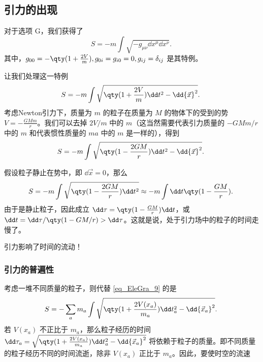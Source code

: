 \subsection{引力的出现}
对于选项 G，我们获得了
\begin{equation}
S=-m\int\sqrt{-g_{\mu\nu}\dd x^\mu\dd x^\nu}.~
\end{equation}
其中，$g_{00}=-\qty(1+\frac{2V}{m}),g_{0i}=g_{i0}=0,g_{ij}=\delta_{ij}$ 是其特例。

让我们处理这一特例
\begin{equation}\label{eq_EleGra_9}
S=-m\int\sqrt{\qty(1+\frac{2V}{m})\dd t^2-\dd {\vec x}^2}.~
\end{equation}
考虑Newton引力下，质量为 $m$ 的粒子在质量为 $M$ 的物体下的受到的势 $V=-\frac{GMm}{r}$。我们可以去掉 $2V/m$ 中的 $m$（这当然需要代表引力质量的 $-GMm/r$ 中的 $m$ 和代表惯性质量的 $ma$ 中的 $m$ 是一样的），得到
\begin{equation}
S=-m\int\sqrt{\qty(1-\frac{2GM}{r})\dd t^2-\dd {\vec x}^2}.~
\end{equation}

假设粒子静止在势中，即 $\dd {\vec x}=0$，那么
\begin{equation}
S=-m\int\sqrt{\qty(1-\frac{2GM}{r})\dd t^2}\approx-m\int\dd t\qty(1-\frac{GM}{r}).~
\end{equation}
由于是静止粒子，因此成立 $\dd\tau=\qty(1-\frac{GM}{r})\dd t$，或 $\dd t=\dd \tau/\qty(1-GM/r)>\dd\tau$。这就是说，处于引力场中的粒子的时间走慢了。

引力影响了时间的流动！

\subsubsection{引力的普遍性}
考虑一堆不同质量的粒子，则代替 \autoref{eq_EleGra_9} 的是
\begin{equation}
S=-\sum_a m_a\int\sqrt{\qty(1+\frac{2V(x_a)}{m_a})\dd t_a^2-\dd {\vec x_a}^2}.~
\end{equation}
若 $V(x_a)$ 不正比于 $m_a$，那么粒子经历的时间 $\dd \tau_a=\sqrt{\qty(1+\frac{2V(x_a)}{m_a})\dd t_a^2-\dd {\vec x_a}^2}$ 将依赖于粒子的质量。即不同质量的粒子经历不同的时间流逝，除非 $V(x_a)$ 正比于 $m_a$。因此，要使时空的流速










